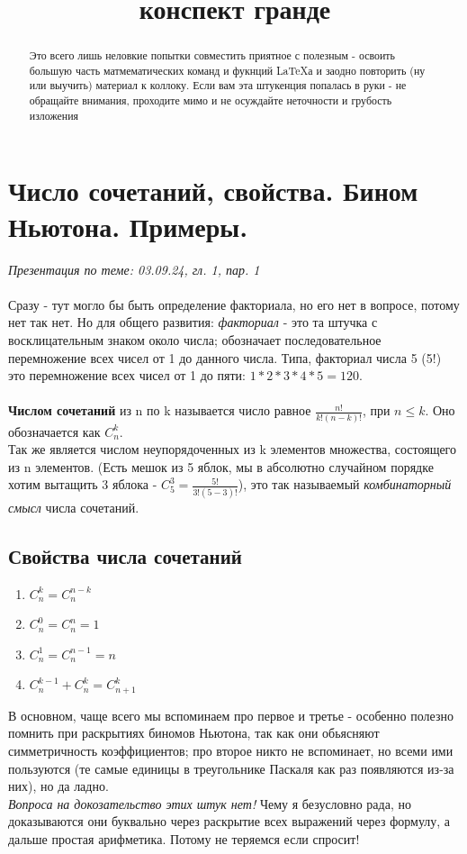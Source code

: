 \documentclass[10pt, a4paper,twocolumn]{article}
\title{конспект гранде}
\begin{document}
\maketitle

\begin{abstract}
Это всего лишь неловкие попытки совместить приятное с полезным - освоить большую часть матмематических команд и фукнций \LaTeX а и заодно повторить (ну или выучить) материал к коллоку. Если вам эта штукенция попалась в руки - не обращайте внимания, проходите мимо и не осуждайте неточности и грубость изложения
\end{abstract}
\tableofcontents

\section{Число сочетаний, свойства. Бином Ньютона. Примеры.}
\textsl{Презентация по теме: 03.09.24, гл. 1, пар. 1}
\\ \\
Сразу - тут могло бы быть определение факториала, но его нет в вопросе, потому нет так нет. Но для общего развития: \textsl{факториал} - это та штучка с восклицательным знаком около числа; обозначает последовательное перемножение всех чисел от 1 до данного числа. Типа, факториал числа 5 (5!) это перемножение всех чисел от 1 до пяти: $1 * 2 * 3 * 4 * 5 = 120.$ 
\\ \\
\textbf{Числом сочетаний} из n по k называется число равное $\frac{n!}{k!(n-k)!}$, при $n \leq k$. Оно обозначается как $C^{k}_n$. \\ Так же является числом неупорядоченных из k элементов множества, состоящего из n элементов. (Есть мешок из 5 яблок, мы в абсолютно случайном порядке хотим вытащить 3 яблока - $C^{3}_5 = \frac{5!}{3!(5 - 3)!}$), это так называемый \textsl{комбинаторный смысл} числа сочетаний.
\subsection{Свойства числа сочетаний}
\begin{enumerate}
\item $C^{k}_n = C^{n - k}_n$
\item $C^{0}_n = C^{n}_n = 1$
\item $C^{1}_n = C^{n - 1}_n = n$
\item $C^{k - 1}_n + C^{k}_n = C^{k}_{n+1}$ 
\end{enumerate}
В основном, чаще всего мы вспоминаем про первое и третье - особенно полезно помнить при раскрытиях биномов Ньютона, так как они обьясняют симметричность коэффициентов; про второе никто не вспоминает, но всеми ими пользуются (те самые единицы в треугольнике Паскаля как раз появляются из-за них), но да ладно. \\ \textsl{Вопроса на докозательство этих штук нет!} Чему я безусловно рада, но доказываются они буквально через раскрытие всех выражений через формулу, а дальше простая арифметика. Потому не теряемся если спросит!
\end{document}
